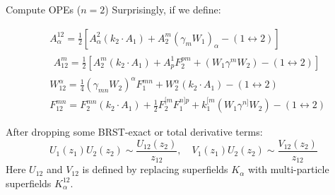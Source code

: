 \documentclass{beamer}
\begin{document}
\begin{frame}[allowframebreaks]{Compute OPEs ($n=2$)}
Surprisingly, if we define:
\vspace{-6pt}
\begin{small}
\begin{equation*}
	\begin{aligned}
		&A_{\alpha}^{12}=\frac{1}{2}\left[A_{\alpha}^{2}(k_{2}\cdot A_{1})+A_{2}^{m}(\gamma_{m}W_{1})_{\alpha}-(1\leftrightarrow2)\right]\\&\begin{aligned}A_{12}^m=\frac{1}{2}\left[A_2^m(k_2\cdot A_1)+A_p^1F_2^{pm}+(W_1\gamma^mW_2)-(1\leftrightarrow2)\right]\end{aligned}\\&W_{12}^{\alpha}=\frac{1}{4}(\gamma_{mn}W_{2})^{\alpha}F_{1}^{mn}+W_{2}^{\alpha}(k_{2}\cdot A_{1})-(1\leftrightarrow2)\\&F_{12}^{mn}=F_{2}^{mn}(k_{2}\cdot A_{1})+\frac{1}{2}F_{2}^{[m}F_{1}^{n]p}+k_{1}^{[m}(W_{1}\gamma^{n]}W_{2})-(1\leftrightarrow2)
	\end{aligned}
\end{equation*}
\end{small}
After dropping some BRST-exact or total derivative terms:
\vspace{-6pt}
\begin{equation*}
	U_1(z_1)U_2(z_2)\sim\frac{U_{12}(z_2)}{z_{12}},\quad V_1(z_1)U_2(z_2)\sim\frac{V_{12}(z_2)}{z_{12}}
\end{equation*}
Here $U_{12}$ and $V_{12}$ is defined by replacing superfields $K_\alpha$ with {\color{WHU}multi-particle superfields} $K_\alpha^{12}$.
\end{frame}
\end{document}

